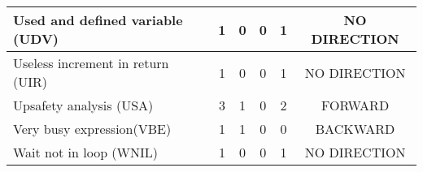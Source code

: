 \begin{table}[htbp]
{\begin{tabular}{|l|c|c|c|c|c|}
    \hline
    Used and defined variable (UDV) & 1     & 0     & 0     & 1     & NO DIRECTION \\
    \hline
    Useless increment in return (UIR) & 1     & 0     & 0     & 1     & NO DIRECTION \\
    \hline
    Upsafety analysis (USA) & 3     & 1     & 0     & 2     & FORWARD \\
    \hline
    Very busy expression(VBE) & 1     & 1     & 0     & 0     & BACKWARD \\
    \hline
    Wait not in loop (WNIL) & 1     & 0     & 0     & 1     & NO DIRECTION \\
    \hline
    \end{tabular}}
  \label{tab:analysis-table}%
\end{table}%
